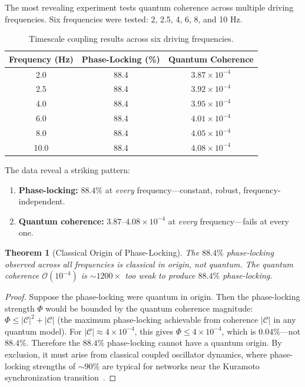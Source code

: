 \documentclass[twocolumn,10pt,a4paper]{article}
\newtheorem{theorem}{Theorem}[section]
\theoremstyle{definition}
\theoremstyle{remark}
\begin{document}
The most revealing experiment tests quantum coherence across multiple driving frequencies. Six frequencies were tested: 2, 2.5, 4, 6, 8, and 10 Hz.

\begin{table}[H]
\centering
\caption{Timescale coupling results across six driving frequencies.}
\label{tab:timescale}
\begin{tabular}{@{}ccc@{}}
\toprule
Frequency (Hz) & Phase-Locking (\%) & Quantum Coherence \\
\midrule
2.0  & 88.4 & $3.87 \times 10^{-4}$ \\
2.5  & 88.4 & $3.92 \times 10^{-4}$ \\
4.0  & 88.4 & $3.95 \times 10^{-4}$ \\
6.0  & 88.4 & $4.01 \times 10^{-4}$ \\
8.0  & 88.4 & $4.05 \times 10^{-4}$ \\
10.0 & 88.4 & $4.08 \times 10^{-4}$ \\
\bottomrule
\end{tabular}
\end{table}

The data reveal a striking pattern:
\begin{enumerate}[leftmargin=2em]
    \item \textbf{Phase-locking:} $88.4\%$ at \emph{every} frequency---constant, robust, frequency-independent.
    \item \textbf{Quantum coherence:} $3.87$--$4.08 \times 10^{-4}$ at \emph{every} frequency---fails at every one.
\end{enumerate}

\begin{theorem}[Classical Origin of Phase-Locking]
\label{thm:phase_locking}
The $88.4\%$ phase-locking observed across all frequencies is classical in origin, not quantum. The quantum coherence $\mathcal{O}(10^{-4})$ is $\sim 1200\times$ too weak to produce $88.4\%$ phase-locking.
\end{theorem}

\begin{proof}
Suppose the phase-locking were quantum in origin. Then the phase-locking strength $\Phi$ would be bounded by the quantum coherence magnitude: $\Phi \leq |\mathcal{C}|^2 + |\mathcal{C}|$ (the maximum phase-locking achievable from coherence $|\mathcal{C}|$ in any quantum model). For $|\mathcal{C}| \approx 4 \times 10^{-4}$, this gives $\Phi \leq 4 \times 10^{-4}$, which is $0.04\%$---not $88.4\%$. Therefore the $88.4\%$ phase-locking cannot have a quantum origin. By exclusion, it must arise from classical coupled oscillator dynamics, where phase-locking strengths of $\sim 90\%$ are typical for networks near the Kuramoto synchronization transition~\citep{kuramoto1984chemical, strogatz2000nonlinear}. \qedhere
\end{proof}
\end{document}
